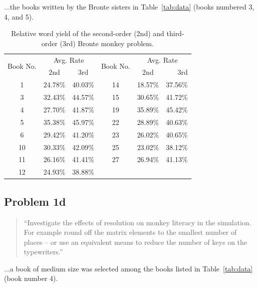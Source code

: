 \documentclass[conference]{IEEEtran}
\newcommand{\codefile}[1]{
  \begin{framed}
  \fontsize{5.65}{6.78}\selectfont
  
  \end{framed}
}
\begin{document}
...the books written by the Bronte sisters in Table~\ref{tab:data}
(books numbered 3, 4, and 5).

\codefile{problem1c.py}

\begin{table}
\caption{Relative word yield of the second-order (2nd) and 
third-order (3rd) Bronte monkey problem.\label{tab:problem1c}}
\vspace{-10pt}
\begin{center}

\begin{tabular}{cccccr}
\hline 
\multirow{2}{*}{Book No.} & \multicolumn{2}{c}{Avg. Rate} & \multirow{2}{*}{Book No.} & \multicolumn{2}{c}{Avg. Rate} \\
\cline{2-3} \cline{5-6} 
 & 2nd & 3rd &  & 2nd & 3rd\hspace{0.75em} \\
\hline
1  & 24.78\% & 40.03\% & 14 & 18.57\% & 37.56\% \\
3  & 32.43\% & 44.57\% & 15 & 30.65\% & 41.72\% \\
4  & 27.70\% & 41.87\% & 19 & 35.89\% & 45.42\% \\
5  & 35.38\% & 45.97\% & 22 & 28.89\% & 40.63\% \\
6  & 29.42\% & 41.20\% & 23 & 26.02\% & 40.65\% \\
10 & 30.33\% & 42.09\% & 25 & 23.02\% & 38.12\% \\
11 & 26.16\% & 41.41\% & 27 & 26.94\% & 41.13\% \\
12 & 24.93\% & 38.88\% &    &    & \\
\hline
\end{tabular}
\end{center}
\end{table}


\subsection{Problem 1d}
\label{sec:problem1d}

\begin{quote}
``Investigate the effects of resolution on monkey literacy in the simulation. 
For example round off the matrix elements to the smallest number of places --
or use an equivalent means to reduce the number of keys on the typewriters.''
\end{quote}

...a book of medium size was selected among the books listed in Table~\ref{tab:data} 
(book number 4).
\end{document}
